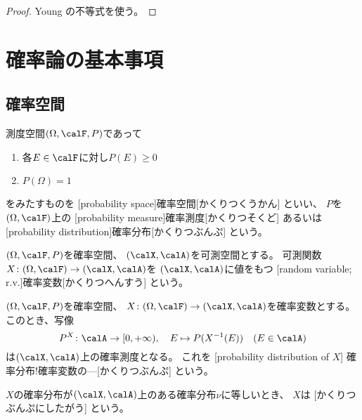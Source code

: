 \documentclass[report]{jlreq}
\begin{document}
\begin{proof}
    Young の不等式を使う。
\end{proof}

%
\section{確率論の基本事項}

\subsection{確率空間}

\begin{definition}[確率空間]
    測度空間$(\Omega, \calF, P)$であって
    \begin{enumerate}
        \item 各$E \in \calF$に対し$P(E) \ge 0$
        \item $P(\Omega) = 1$
    \end{enumerate}
    をみたすものを
    [probability space]{確率空間}[かくりつくうかん]
    といい、
    $P$を$(\Omega, \calF)$上の
    [probability measure]{確率測度}[かくりつそくど]
    あるいは
    [probability distribution]{確率分布}[かくりつぶんぷ]
    という。
\end{definition}

\begin{definition}[確率変数]
    $(\Omega, \calF, P)$を確率空間、
    $(\calX, \calA)$を可測空間とする。
    可測関数$X \colon (\Omega, \calF) \to (\calX, \calA)$を
    $(\calX, \calA)$に値をもつ
    [random variable; r.v.]{確率変数}[かくりつへんすう]
    という。
\end{definition}

\begin{definition}[確率変数の確率分布]
    $(\Omega, \calF, P)$を確率空間、
    $X \colon (\Omega, \calF) \to (\calX, \calA)$を確率変数とする。
    このとき、写像
    \begin{equation}
        P^X \colon \calA \to [0, +\infty),
            \quad
            E \mapsto P(X^{-1}(E))
            \quad
            (E \in \calA)
    \end{equation}
    は$(\calX, \calA)$上の確率測度となる。
    これを
    [probability distribution of $X$]
        {確率分布!確率変数の---}[かくりつぶんぷ]
    という。

    $X$の確率分布が$(\calX, \calA)$上のある確率分布$\nu$に等しいとき、
    $X$は
    [かくりつぶんぷにしたがう]
    という。
\end{definition}
\end{document}
